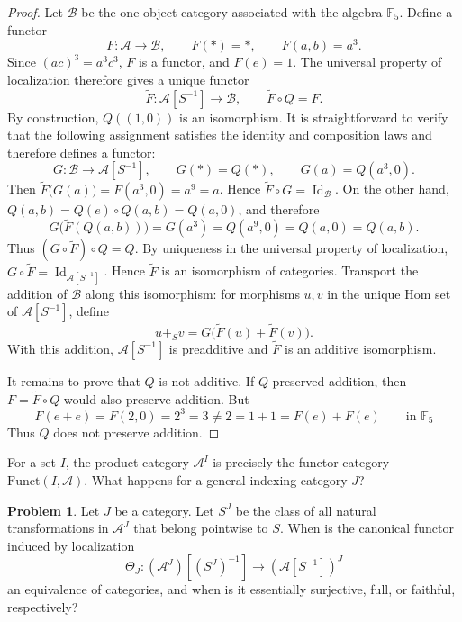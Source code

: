 \documentclass[10pt,a4paper]{amsart}
\theoremstyle{plain}
\theoremstyle{definition}
\newtheorem{problem}[theorem]{Problem}
\theoremstyle{remark}
\begin{document}
\begin{proof}
  Let $\mathcal B$ be the one-object category associated with the algebra $\mathbb F_5$.
  Define a functor
  \[
    F:\mathcal A\longrightarrow\mathcal B,
    \qquad F(*)=*,\qquad F(a,b)=a^3.
  \]
  Since $(ac)^3=a^3c^3$, $F$ is a functor, and $F(e)=1$.
  The universal property of localization therefore gives a unique functor
  \[
    \widetilde F:\mathcal A[S^{-1}]\longrightarrow\mathcal B,
    \qquad
    \widetilde F\circ Q=F.
  \]
  By construction, $Q((1,0))$ is an isomorphism.
  It is straightforward to verify that the following assignment satisfies the identity and composition laws and therefore defines a functor:
  \[
    G:\mathcal B\longrightarrow\mathcal A[S^{-1}],
    \qquad
    G(*)=Q(*),\qquad G(a)=Q(a^3,0).
  \]
  Then $\widetilde F\bigl(G(a)\bigr) =F(a^3,0)=a^9=a$.
  Hence $\widetilde F\circ G=\operatorname{Id}_{\mathcal B}$.
  On the other hand, $Q(a,b)=Q(e)\circ Q(a,b)=Q(a,0)$, and therefore
  \[
    G\bigl(\widetilde F(Q(a,b))\bigr) =G(a^3)=Q(a^9,0)=Q(a,0)=Q(a,b).
  \]
  Thus $(G\circ\widetilde F)\circ Q=Q$.
  By uniqueness in the universal property of localization, $G\circ\widetilde F =\operatorname{Id}_{\mathcal A[S^{-1}]}$.
  Hence $\widetilde F$ is an isomorphism of categories.
  Transport the addition of $\mathcal B$ along this isomorphism: for morphisms $u,v$ in the unique Hom set of $\mathcal A[S^{-1}]$, define
  \[
    u+_{S}v
    =G\bigl(\widetilde F(u)+\widetilde F(v)\bigr).
  \]
  With this addition, $\mathcal A[S^{-1}]$ is preadditive and $\widetilde F$ is an additive isomorphism.

  \medskip

  It remains to prove that $Q$ is not additive.
  If $Q$ preserved addition, then $F=\widetilde F\circ Q$ would also preserve addition.
  But
  \[
    F(e+e)=F(2,0)=2^3=3
    \neq2=1+1=F(e)+F(e) \qquad \text{in $\mathbb F_5$}
  \]
  Thus $Q$ does not preserve addition.
\end{proof}

For a set $I$, the product category $\mathcal{A}^I$ is precisely the functor category $\mathrm{Funct}(I, \mathcal{A})$.
What happens for a general indexing category $J$?

\begin{problem}\label{prob:functor-localization}
Let $J$ be a category.
Let $S^J$ be the class of all natural transformations in $\mathcal A^J$ that belong pointwise to $S$.
When is the canonical functor induced by localization
\[
  \Theta_{J}:(\mathcal A^{J})[(S^{J})^{-1}]\longrightarrow(\mathcal A[S^{-1}])^{J}
\]
an equivalence of categories, and when is it essentially surjective, full, or faithful, respectively?
\end{problem}
\end{document}
